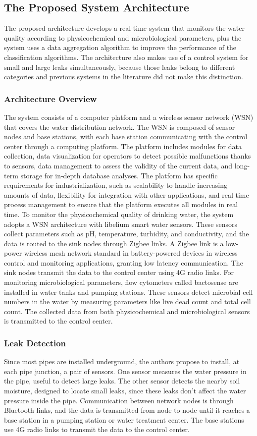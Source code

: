 \documentclass[draft, {\secondLanguage}, english]{volcanica-template}
\begin{document}
\subsection{The Proposed System Architecture}
The proposed architecture develops a real-time system that monitors the water quality according to physicochemical and microbiological parameters, plus the system uses a data aggregation algorithm to improve the performance of the classification algorithms. The architecture also makes use of a control system for small and large leaks simultaneously, because those leaks belong to different categories and previous systems in the literature did not make this distinction.
\subsubsection{Architecture Overview}
The system consists of a computer platform and a wireless sensor network (WSN) that covers the water distribution network. The WSN is composed of sensor nodes and base stations, with each base station communicating with the control center through a computing platform. The platform includes modules for data collection, data visualization for operators to detect possible malfunctions thanks to sensors, data management to assess the validity of the current data, and long-term storage for in-depth database analyses.
The platform has specific requirements for industrialization, such as scalability to handle increasing amounts of data, flexibility for integration with other applications, and real time process management to ensure that the platform executes all modules in real time. To monitor the physicochemical quality of drinking water, the system adopts a WSN architecture with libelium smart water sensors. These sensors collect parameters such as pH, temperature, turbidity, and conductivity, and the data is routed to the sink nodes through Zigbee links. A Zigbee link is a low-power wireless mesh network standard in battery-powered devices in wireless control and monitoring applications, granting low latency communication. The sink nodes transmit the data to the control center using 4G radio links. For monitoring microbiological parameters, flow cytometers called bactosense are installed in water tanks and pumping stations. These sensors detect microbial cell numbers in the water by measuring parameters like live dead count and total cell count. The collected data from both physicochemical and microbiological sensors is transmitted to the control center.
\subsubsection{Leak Detection}
Since most pipes are installed underground, the authors propose to install, at each pipe junction, a pair of sensors. One sensor measures the water pressure in the pipe, useful to detect large leaks. The other sensor detects the nearby soil moisture, designed to locate small leaks, since these leaks don't affect the water pressure inside the pipe. Communication between network nodes is through Bluetooth links, and the data is transmitted from node to node until it reaches a base station in a pumping station or water treatment center. The base stations use 4G radio links to transmit the data to the control center.
\end{document}
